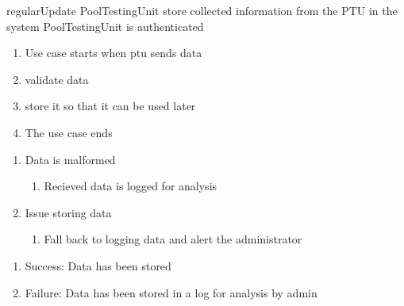 \usecase
{regularUpdate}
{PoolTestingUnit}
{store collected information from the PTU in the system}
{PoolTestingUnit is authenticated}
{
\begin{enumerate}
\item Use case starts when ptu sends data
\item validate data
\item store it so that it can be used later
\item The use case ends
\end{enumerate}
}
{
\begin{enumerate}
\item Data is malformed
\begin{enumerate}
\item Recieved data is logged for analysis
\end{enumerate}
\item Issue storing data
\begin{enumerate}
\item Fall back to logging data and alert the administrator
\end{enumerate}
\end{enumerate}
}
{\begin{enumerate}
\item Success: Data has been stored
\item Failure: Data has been stored in a log for analysis by admin
\end{enumerate}
}

